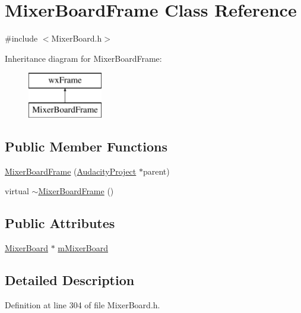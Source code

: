 \hypertarget{class_mixer_board_frame}{}\section{Mixer\+Board\+Frame Class Reference}
\label{class_mixer_board_frame}


{\ttfamily \#include $<$Mixer\+Board.\+h$>$}

Inheritance diagram for Mixer\+Board\+Frame\+:\begin{figure}[H]
\begin{center}
\leavevmode
\includegraphics[height=2.000000cm]{class_mixer_board_frame}
\end{center}
\end{figure}
\subsection*{Public Member Functions}
\begin{DoxyCompactItemize}
\item 
\hyperlink{class_mixer_board_frame_a611228531f279047d8af7096905057a6}{Mixer\+Board\+Frame} (\hyperlink{class_audacity_project}{Audacity\+Project} $\ast$parent)
\item 
virtual \hyperlink{class_mixer_board_frame_ad1cc3191b42bd795f1bb2c92029aebe1}{$\sim$\+Mixer\+Board\+Frame} ()
\end{DoxyCompactItemize}
\subsection*{Public Attributes}
\begin{DoxyCompactItemize}
\item 
\hyperlink{class_mixer_board}{Mixer\+Board} $\ast$ \hyperlink{class_mixer_board_frame_a90e00fa4b175474ee067ff4bf3bef8e6}{m\+Mixer\+Board}
\end{DoxyCompactItemize}


\subsection{Detailed Description}


Definition at line 304 of file Mixer\+Board.\+h.



